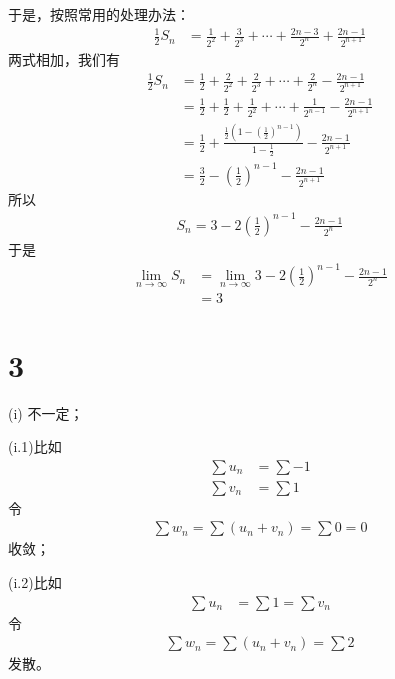\documentclass{article}
\begin{document}
\begin{itemize}
        于是，按照常用的处理办法：
        \begin{align*}
          \frac{1}{2}S_n & = \frac{1}{2^2} + \frac{3}{2^3} + \cdots + \frac{2n - 3}{2^n} + \frac{2n - 1}{2^{n+1}}
        \end{align*}
        两式相加，我们有
        \begin{align*}
          \frac{1}{2}S_n & = \frac{1}{2} + \frac{2}{2^2} + \frac{2}{2^3} + \cdots + \frac{2}{2^n} - \frac{2n - 1}{2^{n+1}}       \\
                         & = \frac{1}{2} + \frac{1}{2} + \frac{1}{2^2} + \cdots + \frac{1}{2^{n-1}} - \frac{2n - 1}{2^{n+1}}     \\
                         & = \frac{1}{2} + \frac{\frac{1}{2}(1 - (\frac{1}{2})^{n-1})}{1 - \frac{1}{2}} - \frac{2n - 1}{2^{n+1}} \\
                         & = \frac{3}{2} - (\frac{1}{2})^{n-1} - \frac{2n - 1}{2^{n+1}}
        \end{align*}
        所以
        \begin{align*}
          S_n = 3 - 2(\frac{1}{2})^{n-1} - \frac{2n - 1}{2^{n}}
        \end{align*}
        于是
        \begin{align*}
          \lim\limits_{n \to \infty} S_n & = \lim\limits_{n \to \infty} 3 - 2(\frac{1}{2})^{n-1} - \frac{2n - 1}{2^{n}} \\
                                         & = 3
        \end{align*}
\end{itemize}

\section*{3}

 (i) 不一定；

(i.1)比如
\begin{align*}
  \sum u_n & = \sum -1 \\
  \sum v_n & = \sum 1
\end{align*}
令
\begin{align*}
  \sum w_n = \sum (u_n + v_n) = \sum 0 = 0
\end{align*}
收敛；

(i.2)比如
\begin{align*}
  \sum u_n & = \sum 1 = \sum v_n
\end{align*}
令
\begin{align*}
  \sum w_n = \sum (u_n + v_n) = \sum 2
\end{align*}
发散。
\end{document}
